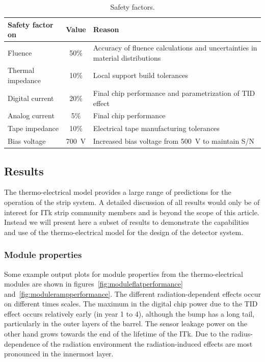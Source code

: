 \begin{table}[htb]
\caption{Safety factors.}
\label{tab:safetyfactors}
\centering
\begin{tabular}{lcl}
Safety factor on & Value & Reason \\
\hline
Fluence  & 50\% & Accuracy of fluence calculations and uncertainties in material distributions\\
Thermal impedance & 10\% & Local support build tolerances\\
Digital current & 20\% & Final chip performance and parametrization of TID effect\\
Analog current & 5\% & Final chip performance\\
Tape impedance & 10\% & Electrical tape manufacturing tolerances\\
Bias voltage & 700~V & Increased bias voltage from 500~V to maintain S/N\\
\end{tabular}
\end{table}

\subsection{Results}
The thermo-electrical model provides a large range of predictions for the operation of the strip system. A detailed discussion of all results would only be of interest for ITk strip community members and is beyond the scope of this article. Instead we will present here a subset of results to demonstrate the capabilities and use of the thermo-electrical model for the design of the detector system.

\subsubsection{Module properties}

Some example output plots for module properties from the thermo-electrical modules are shown in figures~\ref{fig:moduleflatperformance} and~\ref{fig:modulerampperformance}. The different radiation-dependent effects occur on different times scales. The maximum in the digital chip power due to the TID effect occurs relatively early (in year 1 to 4), although the bump has a long tail, particularly in the outer layers of the barrel. The sensor leakage power on the other hand grows towards the end of the lifetime of the ITk. Due to the radius-dependence of the radiation environment the radiation-induced effects are most pronounced in the innermost layer.

